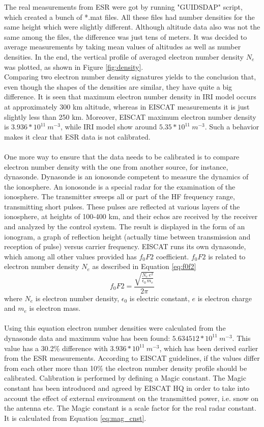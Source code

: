 \documentclass{article}
\begin{document}
The real measurements from ESR were got by running "GUIDSDAP" script, which created a bunch of *.mat files. All these files had number densities for the same height which were slightly different. Although altitude data also was not the same among the files, the difference was just tens of meters. It was decided to average measurements by taking mean values of altitudes as well as number densities. In the end, the vertical profile of averaged electron number density $N_e$ was plotted, as shown in Figure \ref{fig:density}.\\
Comparing two electron number density signatures yields to the conclusion that, even though the shapes of the densities are similar, they have quite a big difference. It is seen that maximum electron number density in IRI model occurs at approximately 300 km altitude, whereas in EISCAT measurements it is just slightly less than 250 km. Moreover, EISCAT maximum electron number density is $3.936*10^{11}\:m^{-3}$, while IRI model show around $5.35*10^{11}\:m^{-3}$. Such a behavior makes it clear that ESR data is not calibrated.\\
\\
One more way to ensure that the data needs to be calibrated is to compare electron number density with the one from another source, for instance, dynasonde. Dynasonde is an ionosonde competent to measure the dynamics of the ionosphere. \cite{Ngdc:2004d} An ionosonde is a special radar for the examination of the ionosphere. The transmitter sweeps all or part of the HF frequency range, transmitting short pulses. These pulses are reflected at various layers of the ionosphere, at heights of 100-400 km, and their echos are received by the receiver and analyzed by the control system. The result is displayed in the form of an ionogram, a graph of reflection height (actually time between transmission and reception of pulse) versus carrier frequency. \cite{Wiki:2012i} EISCAT runs its own dynasonde, which among all other values provided has $f_0F2$ coefficient. $f_0F2$ is related to electron number density $N_e$ as described in Equation \ref{eq:f0f2}
\begin{equation}
\label{eq:f0f2}
f_0F2=\frac{\sqrt{\frac{N_e\,e^2}{\epsilon_0\,m_e}}}{2\pi}
\end{equation}
where $N_e$ is electron number density, $\epsilon_0$ is electric constant, $e$ is electron charge and $m_e$ is electron mass.\\
\\
Using this equation electron number densities were calculated from the dynasonde data and maximum value has been found: $5.634512*10^{11}\:m^{-3}$. This value has a 30.2\% difference with $3.936*10^{11}\:m^{-3}$, which has been derived earlier from the ESR measurements. According to EISCAT guidelines, if the values differ from each other more than 10\% the electron number density profile should be calibrated. Calibration is performed by defining a Magic constant. The Magic constant has been introduced and agreed by EISCAT HQ in order to take into account the effect of external environment on the transmitted power, i.e. snow on the antenna etc. The Magic constant is a scale factor for the real radar constant. \cite{Barabash:2011esr} It is calculated from Equation \ref{eq:mag_cnst}.
\end{document}
